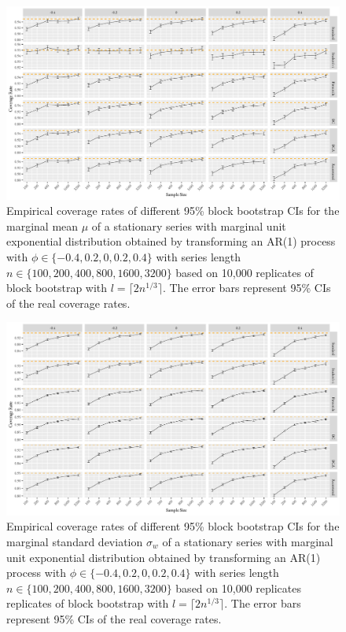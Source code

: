 \documentclass[10pt]{article}
\newcommand{\eds}[1]{\textcolor{red}{EDS: (#1)}}
\newcommand{\mc}[1]{\textcolor{orange}{MC: (#1)}}
\begin{document}
\begin{figure}[tbp]
  \centering
  \includegraphics[width=\textwidth]{figures/plot_exp_mu_2}
  \caption{Empirical coverage rates of different 95\% block bootstrap CIs for
    the marginal mean $\mu$ of a stationary series with marginal unit exponential
    distribution obtained by transforming an AR(1) process with
    $\phi \in \{-0.4, 0.2, 0, 0.2, 0.4\}$ with series length
    $n \in \{100, 200, 400, 800, 1600, 3200\}$ based on 10,000 replicates of
    block bootstrap with $l = \lceil 2n^{1/3} \rceil$. 
    The error bars represent 95\% CIs of the real coverage rates.}
  \label{fig:exp_mu2}
\end{figure}


\begin{figure}[tbp]
  \centering
  \includegraphics[width=\textwidth]{figures/plot_exp_sigma_2}
  \caption{Empirical coverage rates of different 95\% block bootstrap CIs for
    the marginal standard deviation $\sigma_w$ %
    of a stationary series with 
    marginal unit exponential distribution obtained by transforming an AR(1) process
    with $\phi \in \{-0.4, 0.2, 0, 0.2, 0.4\}$ with series length 
    $n \in \{100, 200, 400, 800, 1600, 3200\}$ based on 10,000 replicates 
    replicates of
    block bootstrap with $l = \lceil 2n^{1/3} \rceil$. 
    The error bars represent 95\% CIs of the real coverage rates.}
  \label{fig:exp_sigma2}
\end{figure}
\end{document}
